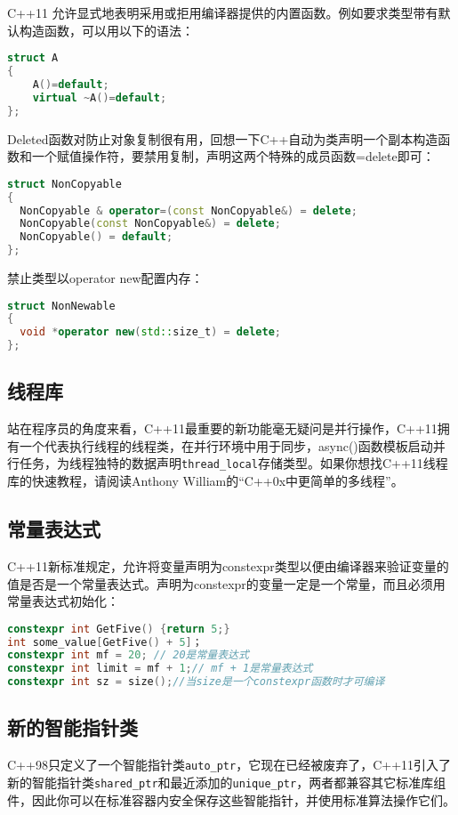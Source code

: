 C++11 允许显式地表明采用或拒用编译器提供的内置函数。例如要求类型带有默认构造函数，可以用以下的语法：
\begin{lstlisting}[language=C++]
struct A   
{   
	A()=default;
    virtual ~A()=default;
};
\end{lstlisting}
Deleted函数对防止对象复制很有用，回想一下C++自动为类声明一个副本构造函数和一个赋值操作符，要禁用复制，声明这两个特殊的成员函数=delete即可：
\begin{lstlisting}[language=C++]
struct NonCopyable
{
  NonCopyable & operator=(const NonCopyable&) = delete;
  NonCopyable(const NonCopyable&) = delete;
  NonCopyable() = default;
};
\end{lstlisting}
禁止类型以operator new配置内存：
\begin{lstlisting}[language=C++]
struct NonNewable
{
  void *operator new(std::size_t) = delete;
};
\end{lstlisting}

\subsection{线程库}
站在程序员的角度来看，C++11最重要的新功能毫无疑问是并行操作，C++11拥有一个代表执行线程的线程类，在并行环境中用于同步，async()函数模板启动并行任务，为线程独特的数据声明\verb$thread_local$存储类型。如果你想找C++11线程库的快速教程，请阅读Anthony William的“C++0x中更简单的多线程”。

\subsection{常量表达式}
C++11新标准规定，允许将变量声明为constexpr类型以便由编译器来验证变量的值是否是一个常量表达式。声明为constexpr的变量一定是一个常量，而且必须用常量表达式初始化：
\begin{lstlisting}[language=C++]
constexpr int GetFive() {return 5;}
int some_value[GetFive() + 5]；
constexpr int mf = 20; // 20是常量表达式  
constexpr int limit = mf + 1;// mf + 1是常量表达式  
constexpr int sz = size();//当size是一个constexpr函数时才可编译
\end{lstlisting}

\subsection{新的智能指针类}
C++98只定义了一个智能指针类\verb$auto_ptr$，它现在已经被废弃了，C++11引入了新的智能指针类\verb$shared_ptr$和最近添加的\verb$unique_ptr$，两者都兼容其它标准库组件，因此你可以在标准容器内安全保存这些智能指针，并使用标准算法操作它们。

